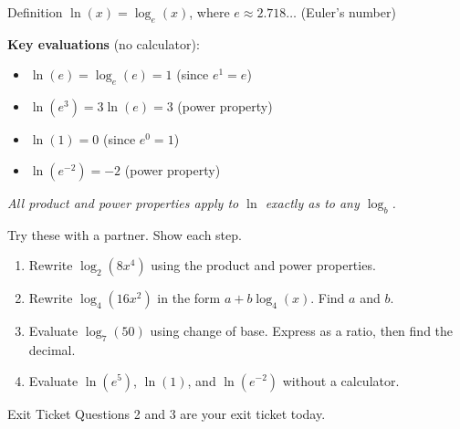\documentclass[aspectratio=169, 11pt]{beamer}
\begin{document}
\begin{frame}[t, plain]

  \vspace{0.3cm}
  \begin{block}{Definition}
    $\ln(x) = \log_e(x)$, where $e \approx 2.718\ldots$ (Euler's number)
  \end{block}

  \vspace{0.4cm}
  \textbf{Key evaluations} (no calculator):
  \begin{itemize}
    \setlength{\itemsep}{8pt}
    \item $\ln(e) = \log_e(e) = 1$ \quad (since $e^1 = e$)
    \item $\ln(e^3) = 3\ln(e) = 3$ \quad (power property)
    \item $\ln(1) = 0$ \quad (since $e^0 = 1$)
    \item $\ln(e^{-2}) = -2$ \quad (power property)
  \end{itemize}

  \vspace{0.3cm}
  \textit{All product and power properties apply to $\ln$ exactly as to any $\log_b$.}
\end{frame}

\begin{frame}[t, plain]

  \vspace{0.2cm}
  Try these with a partner. Show each step.

  \vspace{0.3cm}
  \begin{enumerate}
    \setlength{\itemsep}{10pt}
    \item Rewrite $\log_2(8x^4)$ using the product and power properties.
    \item Rewrite $\log_4(16x^2)$ in the form $a + b\log_4(x)$. Find $a$ and $b$.
    \item Evaluate $\log_7(50)$ using change of base. Express as a ratio, then find the decimal.
    \item Evaluate $\ln(e^5)$, $\ln(1)$, and $\ln(e^{-2})$ without a calculator.
  \end{enumerate}

  \vspace{0.4cm}
  \begin{block}{Exit Ticket}
    Questions 2 and 3 are your exit ticket today.
  \end{block}
\end{frame}
\end{document}
